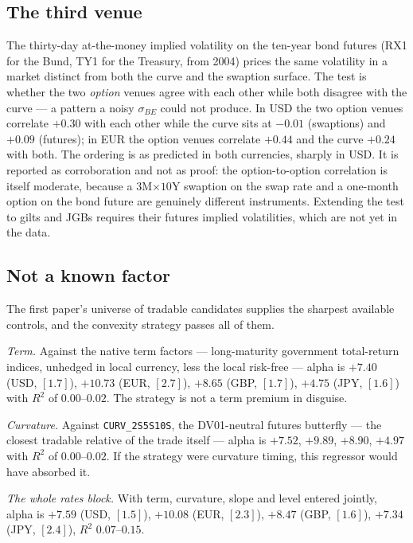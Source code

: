 \documentclass[11pt]{article}
\newcommand{\sBE}{\sigma_{BE}}
\begin{document}
\subsection{The third venue}\label{sec:venues}
The thirty-day at-the-money implied volatility on the ten-year bond futures (RX1 for the Bund, TY1 for
the Treasury, from 2004) prices the same volatility in a market distinct from both the curve and the
swaption surface. The test is whether the two \emph{option} venues agree with each other while both
disagree with the curve --- a pattern a noisy $\sBE$ could not produce. In USD the two option venues
correlate $+0.30$ with each other while the curve sits at $-0.01$ (swaptions) and $+0.09$ (futures); in
EUR the option venues correlate $+0.44$ and the curve $+0.24$ with both. The ordering is as predicted
in both currencies, sharply in USD. It is reported as corroboration and not as proof: the
option-to-option correlation is itself moderate, because a $3$M$\times$$10$Y swaption on the swap rate
and a one-month option on the bond future are genuinely different instruments. Extending the test to
gilts and JGBs requires their futures implied volatilities, which are not yet in the data.

\subsection{Not a known factor}\label{sec:factors}
The first paper's universe of tradable candidates supplies the sharpest available controls, and the
convexity strategy passes all of them.

\emph{Term.} Against the native term factors --- long-maturity government total-return indices,
unhedged in local currency, less the local risk-free --- alpha is $+7.40$ (USD, $[1.7]$), $+10.73$
(EUR, $[2.7]$), $+8.65$ (GBP, $[1.7]$), $+4.75$ (JPY, $[1.6]$) with $R^2$ of $0.00$--$0.02$. The
strategy is not a term premium in disguise.

\emph{Curvature.} Against \texttt{CURV\_2S5S10S}, the DV01-neutral futures butterfly --- the closest
tradable relative of the trade itself --- alpha is $+7.52$, $+9.89$, $+8.90$, $+4.97$ with $R^2$ of
$0.00$--$0.02$. If the strategy were curvature timing, this regressor would have absorbed it.

\emph{The whole rates block.} With term, curvature, slope and level entered jointly, alpha is $+7.59$
(USD, $[1.5]$), $+10.08$ (EUR, $[2.3]$), $+8.47$ (GBP, $[1.6]$), $+7.34$ (JPY, $[2.4]$), $R^2$
$0.07$--$0.15$.
\end{document}
